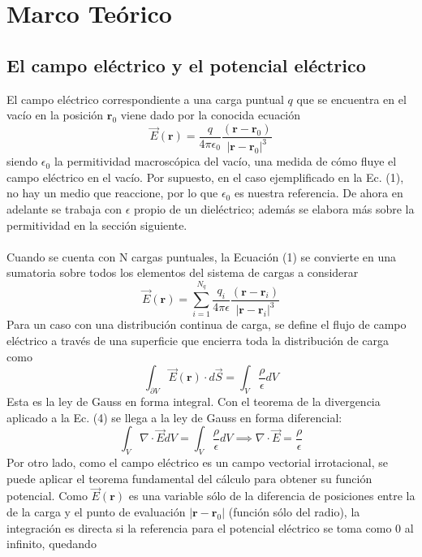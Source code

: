 \documentclass[12pt, oneside, numbers, spanish]{ezthesis}
\numberwithin{equation}{section}
\begin{document}
\chapter{Marco Teórico}
\section{El campo eléctrico y el potencial eléctrico}
El campo eléctrico correspondiente a una carga puntual $q$ que se encuentra en el vacío en la posición $\mathbf{r}_0$ viene dado por la conocida ecuación
\begin{equation}
\vec{E}(\mathbf{r}) = \frac{q}{4\pi\epsilon_0}\frac{(\mathbf{r} - \mathbf{r}_0)}{|\mathbf{r}-\mathbf{r}_0|^3}
\end{equation}
siendo $\epsilon_0$ la permitividad macroscópica del vacío, una medida de cómo fluye el campo eléctrico en el vacío. Por supuesto, en el caso ejemplificado en la Ec. (1), no hay un medio que reaccione, por lo que $\epsilon_0$ es nuestra referencia. De ahora en adelante se trabaja con $\epsilon$ propio de un dieléctrico; además se elabora más sobre la permitividad en la sección siguiente.\\\\
Cuando se cuenta con N cargas puntuales, la Ecuación (1) se convierte en una sumatoria sobre todos los elementos del sistema de cargas a considerar
\begin{equation}
\vec{E}(\mathbf{r}) = \sum_{i=1}^{N_q}\frac{q_i}{4\pi\epsilon}\frac{(\mathbf{r} - \mathbf{r}_i)}{|\mathbf{r}-\mathbf{r}_i|^3}
\end{equation}
Para un caso con una distribución continua de carga, se define el flujo de campo eléctrico a través de una superficie que encierra toda la distribución de carga como
\begin{equation}
\int_{\partial V}\vec{E}(\mathbf{r})\cdot d\vec{S} = \int_V \frac{\rho}{\epsilon} dV
\end{equation}
Esta es la ley de Gauss en forma integral. Con el teorema de la divergencia aplicado a la Ec. (4) se llega a la ley de Gauss en forma diferencial:
\begin{equation}
\int_V \nabla\cdot\vec{E} dV = \int_V \frac{\rho}{\epsilon}dV \implies \nabla\cdot\vec{E} = \frac{\rho}{\epsilon}
\end{equation}
Por otro lado, como el campo eléctrico es un campo vectorial irrotacional, se puede aplicar el teorema fundamental del cálculo para obtener su función potencial. Como $\vec{E}(\mathbf{r})$ es una variable sólo de la diferencia de posiciones entre la de la carga y el punto de evaluación $|\mathbf{r} - \mathbf{r}_0|$ (función sólo del radio), la integración es directa si la referencia para el potencial eléctrico se toma como $0$ al infinito, quedando
\end{document}

